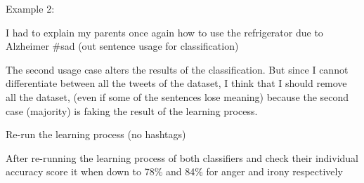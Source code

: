 Example 2:

I had to explain my parents once again how to use the refrigerator due to Alzheimer \#sad 
(out sentence usage for classification)

The second usage case alters the results of the classification. But since I cannot differentiate between all the tweets of the dataset, I think that I should remove all the dataset, (even if some of the sentences lose meaning) because the second case (majority) is faking the result of the learning process. 

Re-run the learning process (no hashtags)

After re-running the learning process of both classifiers and check their individual accuracy score it when down to 78\% and 84\% for anger and irony respectively

\fi